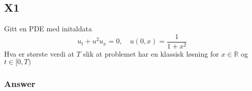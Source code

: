 \documentclass{article}
\theoremstyle{remark}
\begin{document}
 

\subsection{X1}%
\label{sub:x1}

Gitt en PDE med initaldata \[
u_{t} + u^2 u_{x} = 0, \quad  u\left( 0,x \right) = \frac{1}{1+x^2} 
\] 
Hva er største verdi at $T$ slik at problemet har en klassisk løsning for $x \in \mathbb{R} $ og $t \in [0,T)$

\subsubsection{Answer}%
\label{ssub:answer}









\end{document}

